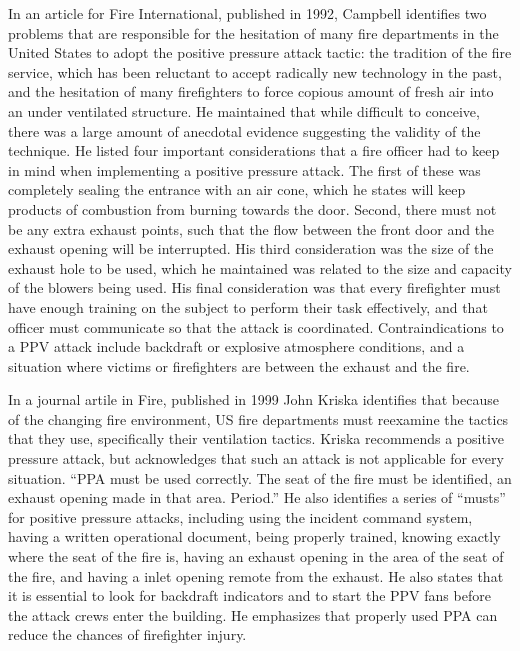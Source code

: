 \documentclass{article}
\begin{document}
In an article for Fire International, published in 1992, Campbell identifies two problems that are responsible for the hesitation of many fire departments in the United States to adopt the positive pressure attack tactic: the tradition of the fire service, which has been reluctant to accept radically new technology in the past, and the hesitation of many firefighters to force copious amount of fresh air into an under ventilated structure. He maintained that while difficult to conceive, there was a large amount of anecdotal evidence suggesting the validity of the technique. He listed four important considerations that a fire officer had to keep in mind when implementing a positive pressure attack. The first of these was completely sealing the entrance with an air cone, which he states will keep products of combustion from burning towards the door. Second, there must not be any extra exhaust points, such that the flow between the front door and the exhaust opening will be interrupted. His third consideration was the size of the exhaust hole to be used, which he maintained was related to the size and capacity of the blowers being used. His final consideration was that every firefighter must have enough training on the subject to perform their task effectively, and that officer must communicate so that the attack is coordinated. Contraindications to a PPV attack include backdraft or explosive atmosphere conditions, and a situation where victims or firefighters are between the exhaust and the fire.\cite{traditionvtechnology}

In a journal artile in Fire, published in 1999 John Kriska identifies that because of the changing fire environment, US fire departments must reexamine the tactics that they use, specifically their ventilation tactics. Kriska recommends a positive pressure attack, but acknowledges that such an attack is not applicable for every situation. “PPA must be used correctly. The seat of the fire must be identified, an exhaust opening made in that area. Period.” He also identifies a series of “musts” for positive pressure attacks, including using the incident command system, having a written operational document, being properly trained, knowing exactly where the seat of the fire is, having an exhaust opening in the area of the seat of the fire, and having a inlet opening remote from the exhaust. He also states that it is essential to look for backdraft indicators and to start the PPV fans before the attack crews enter the building. He emphasizes that properly used PPA can reduce the chances of firefighter injury.\cite{KriskaPPA}
\end{document}
